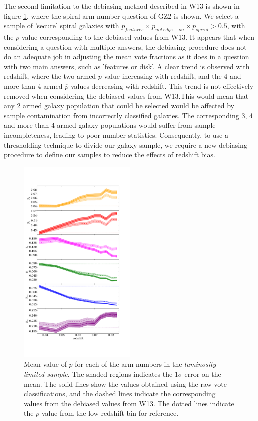 \documentclass[useAMS,usenatbib]{mn2e}
\begin{document}
The second limitation to the debiasing method described in W13 is shown in figure \ref{fig:arm_bias}, where the spiral arm number question of GZ2 is shown. We select a sample of 'secure' spiral galaxies with $p_{features} \times p_{not \, edge-on} \times p_{spiral} > 0.5$, with the $p$ value corresponding to the debiased values from W13. It appears that when considering a question with multiple answers, the debiasing procedure does not do an adequate job in adjusting the mean vote fractions as it does in a question with two main answers, such as 'features or disk'. A clear trend is observed with redshift, where the two armed $\overline{p}$ value increasing with redshift, and the 4 and more than 4 armed $\overline{p}$ values decreasing with redshift. This trend is not effectively removed when considering the debiased values from W13.This would mean that any 2 armed galaxy population that could be selected would be affected by sample contamination from incorrectly classified galaxies. The corresponding 3, 4 and more than 4 armed galaxy populations would suffer from sample incompleteness, leading to poor number statistics. Consequently, to use a thresholding technique to divide our galaxy sample, we require a new debiasing procedure to define our samples to reduce the effects of redshift bias.

\begin{figure}
		\centering
		
        \includegraphics[width=0.5\textwidth]{Data_imgs/arm_bias.pdf}
		
        \caption{Mean value of $p$ for each of the arm numbers in the \textit{luminosity limited sample}. The shaded regions indicates the $1 \sigma$ error on the mean. The solid lines show the values obtained using the raw vote classifications, and the dashed lines indicate the corresponding values from the debiased values from W13. The dotted lines indicate the $p$ value from the low redshift bin for reference.}
		
        \label{fig:arm_bias}
        
\end{figure}
\end{document}
